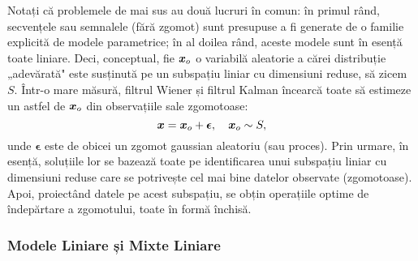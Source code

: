 \documentclass[../../book-main_ro.tex]{subfiles}
\begin{document}
Notați că problemele de mai sus au două lucruri în comun: în primul rând, secvențele sau semnalele (fără zgomot) sunt presupuse a fi generate de o familie explicită de modele parametrice; în al doilea rând, aceste modele sunt în esență toate liniare. Deci, conceptual, fie $\bm{x}_o$ o variabilă aleatorie a cărei distribuție „adevărată" este susținută pe un subspațiu liniar cu dimensiuni reduse, să zicem $S$. Într-o mare măsură, filtrul Wiener și filtrul Kalman încearcă toate să estimeze un astfel de $\bm{x}_o$ din observațiile sale zgomotoase:
\begin{equation}
    \bm{x} = \bm{x}_o + \boldsymbol{\epsilon}, \quad \bm{x}_o \sim S,
\end{equation}
unde $\boldsymbol{\epsilon}$ este de obicei un zgomot gaussian aleatoriu (sau proces). Prin urmare, în esență, soluțiile lor se bazează toate pe identificarea unui subspațiu liniar cu dimensiuni reduse care se potrivește cel mai bine datelor observate (zgomotoase). Apoi, proiectând datele pe acest subspațiu, se obțin operațiile optime de îndepărtare a zgomotului, toate în formă închisă.


\subsubsection{Modele Liniare și Mixte Liniare}
\label{sec:PCA-ICA}
\end{document}
